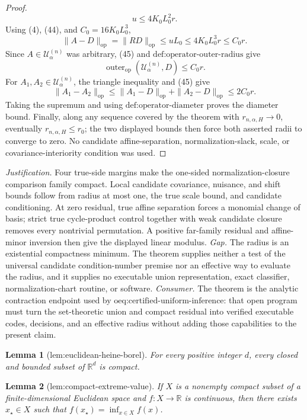 \documentclass{article}
\newtheorem{lemma}{Lemma}
\begin{document}
\begin{proof}
\[
u\leq4K_0L_0^2r.
\tag{44}
\]
Using (4), (44), and \(C_0=16K_0L_0^3\),
\[
\|A-D\|_{\mathrm{op}}
=\|RD\|_{\mathrm{op}}
\leq uL_0
\leq4K_0L_0^3r
\leq C_0r.
\tag{45}
\]
Since \(A\in\mathcal U^{(n)}_\alpha\) was arbitrary, (45) and \(\text{def:operator-outer-radius}\) give
\[
\operatorname{outer}_{\mathrm{op}}(\mathcal U^{(n)}_\alpha,D)
\leq C_0r.
\]
For \(A_1,A_2\in\mathcal U^{(n)}_\alpha\), the triangle inequality and (45) give
\[
\|A_1-A_2\|_{\mathrm{op}}
\leq\|A_1-D\|_{\mathrm{op}}+\|A_2-D\|_{\mathrm{op}}
\leq2C_0r.
\]
Taking the supremum and using \(\text{def:operator-diameter}\) proves the diameter bound. Finally, along any sequence covered by the theorem with \(r_{n,\alpha,H}\to0\), eventually \(r_{n,\alpha,H}\leq r_0\); the two displayed bounds then force both asserted radii to converge to zero. No candidate affine-separation, normalization-slack, scale, or covariance-interiority condition was used.
\end{proof}
\par\smallskip\noindent \textit{Justification.} Four true-side margins make the one-sided normalization-closure comparison family compact. Local candidate covariance, nuisance, and shift bounds follow from radius at most one, the true scale bound, and candidate conditioning. At zero residual, true affine separation forces a monomial change of basis; strict true cycle-product control together with weak candidate closure removes every nontrivial permutation. A positive far-family residual and affine-minor inversion then give the displayed linear modulus. \textit{Gap.} The radius is an existential compactness minimum. The theorem supplies neither a test of the universal candidate condition-number premise nor an effective way to evaluate the radius, and it supplies no executable union representation, exact classifier, normalization-chart routine, or software. \textit{Consumer.} The theorem is the analytic contraction endpoint used by \(\text{oeq:certified-uniform-inference}\): that open program must turn the set-theoretic union and compact residual into verified executable codes, decisions, and an effective radius without adding those capabilities to the present claim.

\begin{lemma}[lem:euclidean-heine-borel]\label{lem:euclidean-heine-borel}
For every positive integer \(d\), every closed and bounded subset of \(\mathbb R^d\) is compact.
\end{lemma}

\begin{lemma}[lem:compact-extreme-value]\label{lem:compact-extreme-value}
If \(X\) is a nonempty compact subset of a finite-dimensional Euclidean space and \(f:X\to\mathbb R\) is continuous, then there exists \(x_\star\in X\) such that \(f(x_\star)=\inf_{x\in X}f(x)\).
\end{lemma}
\end{document}
